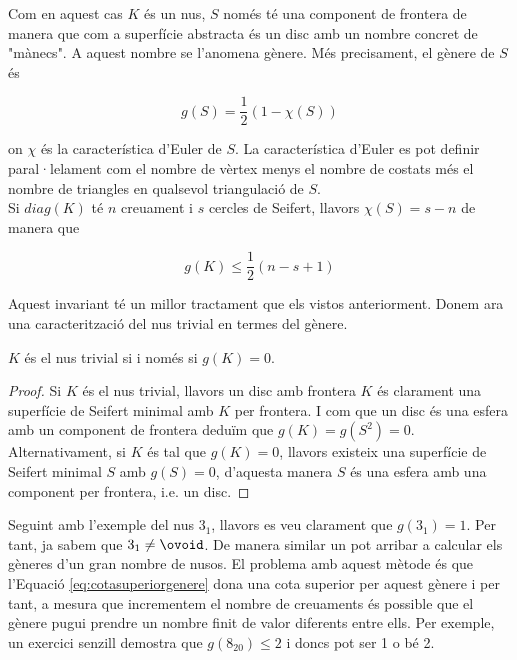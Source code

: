 Com en aquest cas $K$ és un nus, $S$ només té una component de frontera de manera que com a superfície abstracta és un disc amb un nombre concret de "mànecs". A aquest nombre se l'anomena gènere. Més precisament, el gènere de $S$ és

\begin{equation}\label{eq:generedunasuperficie}
	g(S)=\frac{1}{2}(1-\mathcal{\chi}(S))
\end{equation}

on $\mathcal{\chi}$ és la característica d'Euler de $S$. La característica d'Euler es pot definir paral·lelament com el nombre de vèrtex menys el nombre de costats més el nombre de triangles en qualsevol triangulació de $S$.\\

Si $diag(K)$ té $n$ creuament i $s$ cercles de Seifert, llavors $\mathcal{\chi}(S)=s-n$ de manera que

\begin{equation}\label{eq:cotasuperiorgenere}
	g(K)\leq \frac{1}{2}(n-s+1)
\end{equation}

Aquest invariant té un millor tractament que els vistos anteriorment. Donem ara una caracterització del nus trivial en termes del gènere.

\begin{proposition}
	$K$ és el nus trivial si i només si $g(K)=0$.
\end{proposition}

\begin{proof}
	Si $K$ és el nus trivial, llavors un disc amb frontera $K$ és clarament una superfície de Seifert minimal amb $K$ per frontera. I com que un disc és una esfera amb un component de frontera deduïm que $g(K)=g(S^2)=0$. Alternativament, si $K$ és tal que $g(K)=0$, llavors existeix una superfície de Seifert minimal $S$ amb $g(S)=0$, d'aquesta manera $S$ és una esfera amb una component per frontera, i.e. un disc.
\end{proof}

Seguint amb l'exemple del nus $3_1$, llavors es veu clarament que $g(3_1)=1$. Per tant, ja sabem que $3_1\neq\ovoid$. De manera similar un pot arribar a calcular els gèneres d'un gran nombre de nusos. El problema amb aquest mètode és que l'Equació \ref{eq:cotasuperiorgenere} dona una cota superior per aquest gènere i per tant, a mesura que incrementem el nombre de creuaments és possible que el gènere pugui prendre un nombre finit de valor diferents entre ells. Per exemple, un exercici senzill demostra que $g(8_{20})\leq2$ i doncs pot ser 1 o bé 2.

